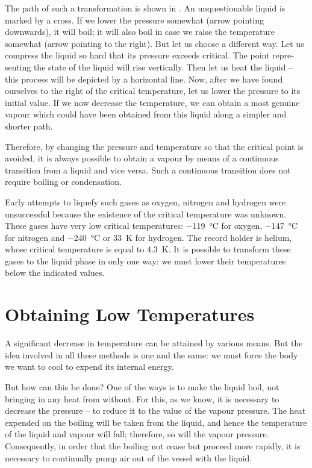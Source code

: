 The path of such a transformation is shown in . An unquestionable liquid is marked by a cross. If we lower the pressure somewhat (arrow pointing downwards), it will boil; it will also boil in case we raise the tempera­ture somewhat (arrow pointing to the right). But let us choose a different way. Let us compress the liquid so hard that its pressure exceeds critical. The point repre­senting the state of the liquid will rise vertically. Then let us heat the liquid -- this process will be depicted by a horizontal line. Now, after we have found ourselves to the right of the critical temperature, let us lower the pressure to its initial value. If we now decrease the tem­perature, we can obtain a most genuine vapour which could have been obtained from this liquid along a simpler and shorter path.

Therefore, by changing the pressure and temperature so that the critical point is avoided, it is always possible to obtain a vapour by means of a continuous transition from a liquid and vice versa. Such a continuous transition does not require boiling or condensation.

Early attempts to liquefy such gases as oxygen, nitro­gen and hydrogen were unsuccessful because the existence of the critical temperature was unknown. These gases have very low critical temperatures: \SI{-119}{\celsius} for oxygen, \SI{-147}{\celsius} for nitrogen and \SI{-240}{\celsius} or \SI{33}{\kelvin} for hydrogen. The record holder is helium, whose critical temperature is equal to \SI{4.3}{\kelvin}. It is possible to transform these gases to the liquid phase in only one way: we must lower their temperatures below the indicated values.

\section{Obtaining Low Temperatures}

A significant decrease in temperature can be attained by various means. But the idea involved in all these meth­ods is one and the same: we must force the body we want to cool to expend its internal energy.

But how can this be done? One of the ways is to make the liquid boil, not bringing in any heat from without. For this, as we know, it is necessary to decrease the pres­sure -- to reduce it to the value of the vapour pressure. The heat expended on the boiling will be taken from the liquid, and hence the temperature of the liquid and va­pour will fall; therefore, so will the vapour pressure. Consequently, in order that the boiling not cease but proceed more rapidly, it is necessary to continually pump air out of the vessel with the liquid.

